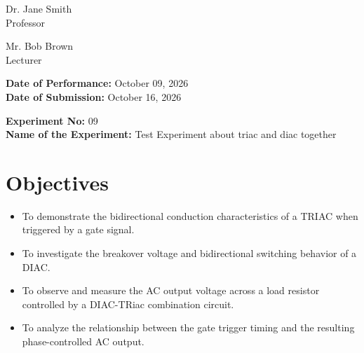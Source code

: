 \documentclass[12pt,a4paper]{article}
\begin{document}
\begin{titlepage}
\begin{minipage}[t]{0.5\textwidth}
\begin{flushright}
            Dr. Jane Smith \\
            Professor \\
            \vspace{0.3cm}
            
            Mr. Bob Brown \\
            Lecturer \\
            
            
        \end{flushright}
    \end{minipage}

    \vfill
    \textbf{Date of Performance:} October 09, 2026 \\
    \textbf{Date of Submission:} October 16, 2026
    
\end{titlepage}

\setcounter{page}{1}
\rmfamily %
\normalsize

\begin{center}
    \textbf{Experiment No:} 09 \\
    \vspace{0.2cm}
    \textbf{Name of the Experiment:} Test Experiment about triac and diac together
\end{center}
\vspace{0.5cm}


\section{Objectives}
\begin{itemize}

    \item To demonstrate the bidirectional conduction characteristics of a TRIAC when triggered by a gate signal.

    \item To investigate the breakover voltage and bidirectional switching behavior of a DIAC.

    \item To observe and measure the AC output voltage across a load resistor controlled by a DIAC-TRiac combination circuit.

    \item To analyze the relationship between the gate trigger timing and the resulting phase-controlled AC output.

\end{itemize}
\end{document}
